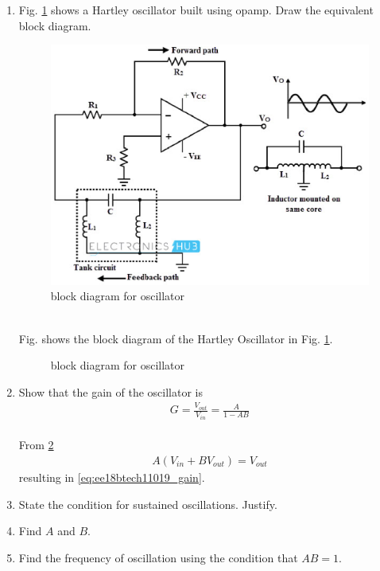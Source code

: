 \begin{enumerate}[label=\thesection.\arabic*.,ref=\thesection.\theenumi]


\item Fig. \ref{fig:ee18btech11019_hart} shows a
Hartley oscillator built using opamp.  Draw the equivalent block diagram.
\begin{figure}[ht]
    \begin{center}
	    \includegraphics[width=\columnwidth]{./figs/ee18btech11019/hart.eps}
	\end{center}
\caption{block diagram for oscillator}
\label{fig:ee18btech11019_hart}
\end{figure}
\\
\solution Fig. \label{fig:ee18btech11019_hart_block} shows the block diagram of the Hartley Oscillator in Fig. \ref{fig:ee18btech11019_hart}.
\begin{figure}[!ht]
    \begin{center}
		
		\resizebox{\columnwidth}{!}{}
	\end{center}
\caption{block diagram for oscillator}
\label{fig:ee18btech11019_hart_block}
\end{figure}

\item Show that the gain of the oscillator is 
\begin{align}
    G = \frac{V_{out}}{V_{in}} = \frac{A}{1 - AB}
\label{eq:ee18btech11019_gain}
\end{align}
%
\\
\solution From \ref{fig:ee18btech11019_hart_block}
%
\begin{align}
    A(V_{in} + BV_{out}) =V_{out} 
\end{align}
%
resulting in \eqref{eq:ee18btech11019_gain}.
\item State the condition for sustained oscillations. Justify.
\item Find $A$ and $B$.
\item Find the frequency of oscillation using the condition that $AB = 1$.
%



\end{enumerate}
